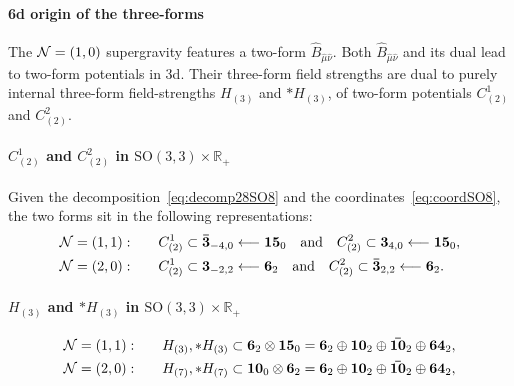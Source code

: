 \documentclass[11pt]{article}
\newcommand{\SO}{\ensuremath{\mathrm{SO}}\xspace}
\newcommand{\R}{\ensuremath{\mathbb{R}}\xspace}
\begin{document}
\paragraph{6d origin of the three-forms} The ${\cal N}=(1,0)$ supergravity features a two-form $\hat{B}_{\hat\mu\hat\nu}$. Both $\hat{B}_{\hat\mu\hat\nu}$ and its dual lead to two-form potentials in 3d. Their three-form field strengths are dual to purely internal three-form field-strengths $H_{(3)}$ and $*H_{(3)}$, of two-form potentials $C_{(2)}^{1}$ and $C_{(2)}^{2}$.

\paragraph{\boldmath $C_{(2)}^{1}$ and $C_{(2)}^{2}$ in $\SO(3,3)\times\R_{+}$} Given the decomposition~\eqref{eq:decomp28SO8} and the coordinates~\eqref{eq:coordSO8}, the two forms sit in the following representations:
\begin{equation}
  \begin{aligned}
    {\cal N}=(1,1):&\qquad C^{1}_{(2)}\subset\bm{\bar{3}}_{-4,0} \longleftarrow\bm{15}_{0}\quad{\rm and}\quad C^{2}_{(2)}\subset\bm{3}_{4,0} \longleftarrow\bm{15}_{0},\\
    {\cal N}=(2,0):&\qquad C^{1}_{(2)}\subset\bm{3}_{-2,2} \longleftarrow\bm{6}_{2}\quad{\rm and}\quad C^{2}_{(2)}\subset\bm{\bar{3}}_{2,2} \longleftarrow\bm{6}_{2}.
  \end{aligned}
\end{equation}

\paragraph{\boldmath $H_{(3)}$ and $*H_{(3)}$ in $\SO(3,3)\times\R_{+}$}
\begin{equation}
  \begin{aligned}
    {\cal N}=(1,1):&\qquad H_{(3)},*H_{(3)} \subset\bm{6}_{2}\otimes\bm{15}_{0}=\bm{6}_{2}\oplus\bm{10}_{2}\oplus\bm{\bar{10}}_{2}\oplus\bm{64}_{2},\\
    {\cal N}=(2,0):&\qquad H_{(7)},*H_{(7)} \subset\bm{10}_{0}\otimes\bm{6}_{2}=\bm{6}_{2}\oplus\bm{10}_{2}\oplus\bm{\bar{10}}_{2}\oplus\bm{64}_{2},
  \end{aligned}
\end{equation}
\end{document}
